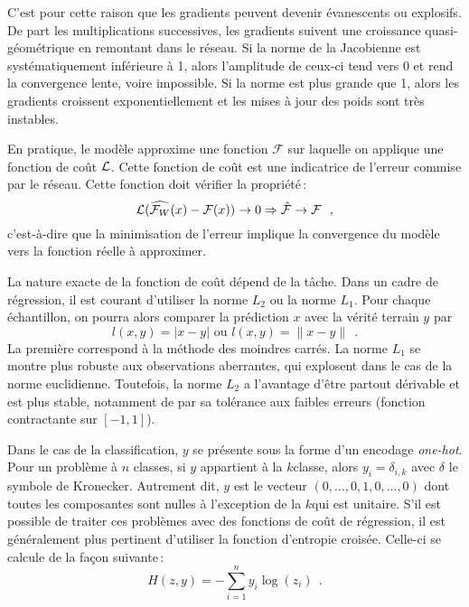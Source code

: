 C'est pour cette raison que les gradients peuvent devenir évanescents ou explosifs. De part les multiplications successives, les gradients suivent une croissance quasi-géométrique en remontant dans le réseau. Si la norme de la Jacobienne est systématiquement inférieure à 1, alors l'amplitude de ceux-ci tend vers $0$ et rend la convergence lente, voire impossible. Si la norme est plus grande que 1, alors les gradients croissent exponentiellement et les mises à jour des poids sont très instables.

%

En pratique, le modèle approxime une fonction $\mathcal{F}$ sur laquelle on applique une fonction de coût $\mathcal{L}$. Cette fonction de coût est une indicatrice de l'erreur commise par le réseau. Cette fonction doit vérifier la propriété\,:
$$\mathcal{L}(\widehat{\mathcal{F}_W}(x) - \mathcal{F}(x)) \rightarrow 0 \Rightarrow \hat{\mathcal{F}} \rightarrow \mathcal{F}~~,$$
c'est-à-dire que la minimisation de l'erreur implique la convergence du modèle vers la fonction réelle à approximer.

La nature exacte de la fonction de coût dépend de la tâche. Dans un cadre de régression, il est courant d'utiliser la norme $L_2$ ou la norme $L_1$. Pour chaque échantillon, on pourra alors comparer la prédiction $x$ avec la vérité terrain $y$ par
$$l(x,y) = |x - y| \text{ ou } l(x,y) = \lVert x - y \rVert~~.$$
La première correspond à la méthode des moindres carrés. La norme $L_1$ se montre plus robuste aux observations aberrantes, qui explosent dans le cas de la norme euclidienne. Toutefois, la norme $L_2$ a l'avantage d'être partout dérivable et est plus stable, notamment de par sa tolérance aux faibles erreurs (fonction contractante sur $[-1, 1]$).

Dans le cas de la classification, $y$ se présente sous la forme d'un encodage \emph{one-hot}. Pour un problème à $n$ classes, si $y$ appartient à la $k$\ieme classe, alors $y_i = \delta_{i,k}$ avec $\delta$ le symbole de Kronecker. Autrement dit, $y$ est le vecteur $(0, \dots, 0, 1, 0, \dots, 0)$ dont toutes les composantes sont nulles à l'exception de la $k$\ieme qui est unitaire. S'il est possible de traiter ces problèmes avec des fonctions de coût de régression, il est généralement plus pertinent d'utiliser la fonction d'entropie croisée. Celle-ci se calcule de la façon suivante\,:
\begin{equation}
  H(z,y) = -\sum_{i=1}^n y_i \log(z_i)~~.
\end{equation}

